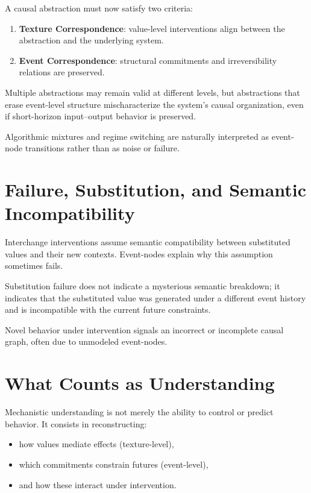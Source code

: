 \documentclass[11pt]{article}
\begin{document}
A causal abstraction must now satisfy two criteria:

\begin{enumerate}
\item \textbf{Texture Correspondence}: value-level interventions align between
the abstraction and the underlying system.
\item \textbf{Event Correspondence}: structural commitments and irreversibility
relations are preserved.
\end{enumerate}

Multiple abstractions may remain valid at different levels, but abstractions that
erase event-level structure mischaracterize the system’s causal organization,
even if short-horizon input--output behavior is preserved.

Algorithmic mixtures and regime switching are naturally interpreted as
event-node transitions rather than as noise or failure.

\section{Failure, Substitution, and Semantic Incompatibility}

Interchange interventions assume semantic compatibility between substituted
values and their new contexts. Event-nodes explain why this assumption sometimes
fails.

Substitution failure does not indicate a mysterious semantic breakdown; it
indicates that the substituted value was generated under a different event
history and is incompatible with the current future constraints.

Novel behavior under intervention signals an incorrect or incomplete causal
graph, often due to unmodeled event-nodes.

\section{What Counts as Understanding}

Mechanistic understanding is not merely the ability to control or predict
behavior. It consists in reconstructing:

\begin{itemize}
\item how values mediate effects (texture-level),
\item which commitments constrain futures (event-level),
\item and how these interact under intervention.
\end{itemize}
\end{document}
